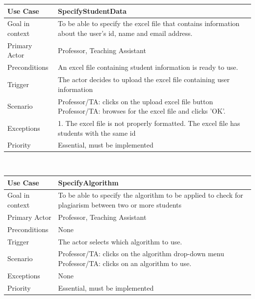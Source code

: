 \documentclass[12pt]{article}
\begin{document}
\begin{tabular}{ |p{3cm}||p{11.25cm}| }
 \hline
 \textbf{Use Case} & \textbf{SpecifyStudentData}\\
 \hline
 Goal in context & To be able to specify the excel file that contains information about the user's id, name and email address. \\
 \hline
 Primary Actor & Professor, Teaching Assistant \\
 \hline
 Preconditions& An excel file containing student information is ready to use. \\
 \hline
 Trigger &The actor decides to upload the excel file containing user information\\
 \hline
 Scenario    &Professor/TA: clicks on the upload excel file button \newline
 Professor/TA: browses for the excel file and clicks 'OK'.\\
\hline
 Exceptions&  
1. The excel file is not properly formatted\newline
2. The excel file has students with the same id 
\\
\hline
 Priority& Essential, must be implemented \\
 \hline
\end{tabular} \\[2.0 em]


\begin{tabular}{ |p{3cm}||p{11.25cm}| }
 \hline
 \textbf{Use Case} & \textbf{SpecifyAlgorithm}\\
 \hline
 Goal in context & To be able to specify the algorithm to be applied to check for plagiarism between two or more students \\
 \hline
 Primary Actor & Professor, Teaching Assistant \\
 \hline
 Preconditions& None \\
 \hline
 Trigger &The actor selects which algorithm to use. \\
 \hline
 Scenario    &Professor/TA: clicks on the algorithm drop-down menu \newline
 Professor/TA: clicks on an algorithm to use.\\
\hline
 Exceptions&  None\\
\hline
 Priority& Essential, must be implemented \\
 \hline
\end{tabular} \\[2.0 em]
\end{document}
